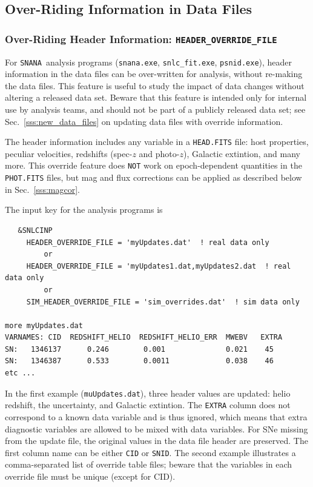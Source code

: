 \documentclass[12pt]{article}
\newcommand{\snana}{{\tt SNANA}}
\begin{document}
\clearpage
\subsection{Over-Riding Information in Data Files}
\label{subsec:data_override}


\subsubsection{Over-Riding Header Information: \texttt{HEADER\_OVERRIDE\_FILE} }
\label{sss:header_override}

For \snana\ analysis programs 
({\tt snana.exe}, {\tt snlc\_fit.exe}, {\tt psnid.exe}),
header information in the data files can be over-written for analysis,
without re-making the data files.
This feature is useful to study the impact of data changes
without altering a released data set. 
Beware that this feature is intended only for internal 
use by analysis teams,
and should not be part of a publicly released data set;
see Sec.~\ref{sss:new_data_files} on updating data files with 
override information.

The header information includes any variable in a {\tt *HEAD.FITS} file:
host properties, peculiar velocities, redshifts (spec-$z$ and photo-$z$), 
Galactic extintion, and many more.
This override feature does {\tt NOT} work
on epoch-dependent quantities in the {\tt *PHOT.FITS} files, 
but mag and flux corrections can be applied as described below in Sec.~\ref{sss:magcor}.

The input key for the analysis programs is
\begin{verbatim}
   &SNLCINP
     HEADER_OVERRIDE_FILE = 'myUpdates.dat'  ! real data only
         or
     HEADER_OVERRIDE_FILE = 'myUpdates1.dat,myUpdates2.dat  ! real data only
         or
     SIM_HEADER_OVERRIDE_FILE = 'sim_overrides.dat'  ! sim data only

more myUpdates.dat
VARNAMES: CID  REDSHIFT_HELIO  REDSHIFT_HELIO_ERR  MWEBV   EXTRA
SN:   1346137      0.246        0.001              0.021    45
SN:   1346387      0.533        0.0011             0.038    46
etc ...
\end{verbatim}

In the first example ({\tt muUpdates.dat}), three header values are updated:
helio redshift, the uncertainty, and Galactic extintion. The {\tt EXTRA} column
does not correspond to a known data variable and is thus ignored, which means
that extra diagnostic variables are allowed to be mixed with data variables.
For SNe missing from the update file, the original values in the 
data file header are preserved. 
The first column name can be either {\tt CID} or {\tt SNID}.
The second example illustrates a comma-separated list of override table files;
beware that the variables in each override file must be unique (except for CID).
\end{document}
